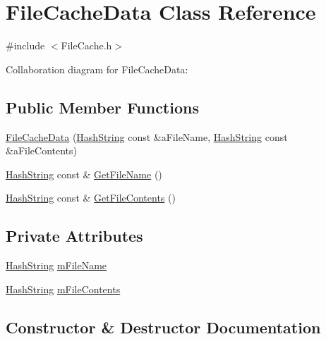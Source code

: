 \hypertarget{classFileCacheData}{}\section{File\+Cache\+Data Class Reference}
\label{classFileCacheData}


{\ttfamily \#include $<$File\+Cache.\+h$>$}



Collaboration diagram for File\+Cache\+Data\+:
\subsection*{Public Member Functions}
\begin{DoxyCompactItemize}
\item 
\hyperlink{classFileCacheData_a4a4268c3633372082428e7e6a1b0852f}{File\+Cache\+Data} (\hyperlink{classHashString}{Hash\+String} const \&a\+File\+Name, \hyperlink{classHashString}{Hash\+String} const \&a\+File\+Contents)
\item 
\hyperlink{classHashString}{Hash\+String} const \& \hyperlink{classFileCacheData_a7c3aa7138cc074f4e44c8e39a1f443b2}{Get\+File\+Name} ()
\item 
\hyperlink{classHashString}{Hash\+String} const \& \hyperlink{classFileCacheData_a295e1b07528b2c7380392cac125d7c78}{Get\+File\+Contents} ()
\end{DoxyCompactItemize}
\subsection*{Private Attributes}
\begin{DoxyCompactItemize}
\item 
\hyperlink{classHashString}{Hash\+String} \hyperlink{classFileCacheData_aee99122549505bb51d7ab1f502878612}{m\+File\+Name}
\item 
\hyperlink{classHashString}{Hash\+String} \hyperlink{classFileCacheData_a409bbf6beaa7225e510f63b9d9101bb0}{m\+File\+Contents}
\end{DoxyCompactItemize}


\subsection{Constructor \& Destructor Documentation}

